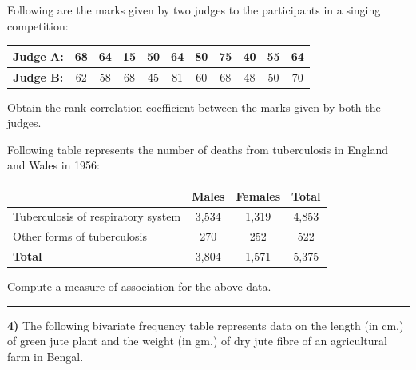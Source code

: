 \documentclass[11pt,a4paper]{article}
\begin{document}
\begin{parts}
  \item Following are the marks given by two judges to the participants in a singing competition:
  
\begin{center}
  \small
  
\begin{tabular}{|c|c|c|c|c|c|c|c|c|c|c|}
  \hline
   \textbf{Judge A:} & 68 & 64 & 15 & 50 & 64 & 80 & 75 & 40 & 55 & 64 \\ \hline
   \textbf{Judge B:} & 62 & 58 & 68 & 45 & 81 & 60 & 68 & 48 & 50 & 70 \\ \hline
  \end{tabular}
  \end{center}
  Obtain the rank correlation coefficient between the marks given by both the judges.

  \item Following table represents the number of deaths from tuberculosis in England and Wales in 1956:
  
\begin{center}
  \small
  
\begin{tabular}{|l|c|c|c|}
  \hline
  &   \textbf{Males} &   \textbf{Females} &   \textbf{Total} \\ \hline
  Tuberculosis of respiratory system & 3,534 & 1,319 & 4,853 \\ \hline
  Other forms of tuberculosis & 270 & 252 & 522 \\ \hline
   \textbf{Total} & 3,804 & 1,571 & 5,375 \\ \hline
  \end{tabular}
  \end{center}
  Compute a measure of association for the above data.
\end{parts}

\medskip\rule{\linewidth}{0.2pt}\medskip




\noindent   \textbf{4)} The following bivariate frequency table represents data on the length (in cm.) of green jute plant and the weight (in gm.) of dry jute fibre of an agricultural farm in Bengal.
\end{document}
